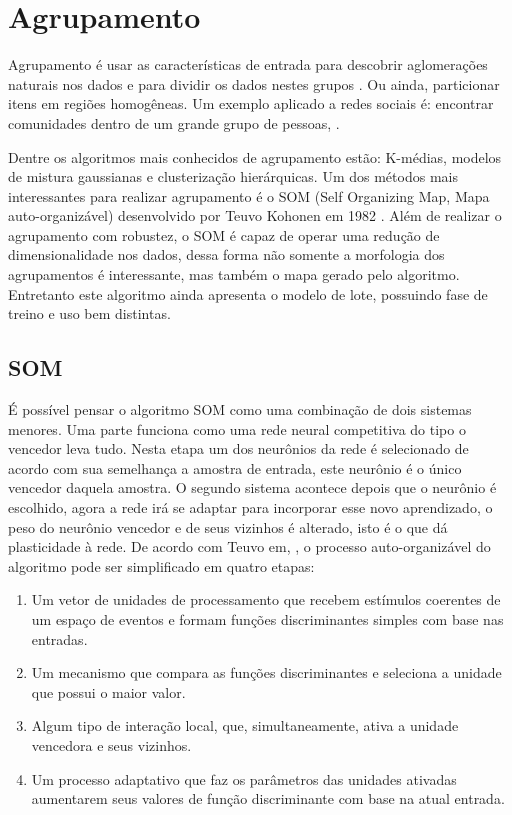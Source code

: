 \chapter{Agrupamento}
Agrupamento é usar as características de entrada para descobrir aglomerações naturais nos dados e para dividir os dados nestes grupos \cite{real2013}. Ou ainda, particionar itens em regiões homogêneas. Um exemplo aplicado a redes sociais é: encontrar comunidades dentro de um grande grupo de pessoas, .

Dentre os algoritmos mais conhecidos de agrupamento estão: K-médias, modelos de mistura gaussianas e clusterização hierárquicas. Um dos métodos mais interessantes para realizar agrupamento é o SOM (Self Organizing Map, Mapa auto-organizável) desenvolvido por Teuvo Kohonen em 1982 \cite{kohonen1982}. Além de realizar o agrupamento com robustez, o SOM é capaz de operar uma redução de dimensionalidade nos dados, dessa forma não somente a morfologia dos agrupamentos é interessante, mas também o mapa gerado pelo algoritmo. Entretanto este algoritmo ainda apresenta o modelo de lote, possuindo fase de treino e uso bem distintas.

\section{SOM}
É possível pensar o algoritmo SOM como uma combinação de dois sistemas menores. Uma parte funciona como uma rede neural competitiva do tipo o vencedor leva tudo. Nesta etapa um dos neurônios da rede é selecionado de acordo com sua semelhança a amostra de entrada, este neurônio é o único vencedor daquela amostra. O segundo sistema acontece depois que o neurônio é escolhido, agora a rede irá se adaptar para incorporar esse novo aprendizado, o peso do neurônio vencedor e de seus vizinhos é alterado, isto é o que dá plasticidade à rede. 
De acordo com Teuvo em, , o processo auto-organizável do algoritmo pode ser simplificado em quatro etapas:

\begin{enumerate}
\item Um vetor de unidades de processamento que recebem estímulos coerentes de um espaço de eventos e formam funções discriminantes simples com base nas entradas.
\item Um mecanismo que compara as funções discriminantes e seleciona a unidade que possui o maior valor.
\item Algum tipo de interação local, que, simultaneamente, ativa a unidade vencedora e seus vizinhos.
\item Um processo adaptativo que faz os parâmetros das unidades ativadas aumentarem seus valores de função discriminante com base na atual entrada.
\end{enumerate}

